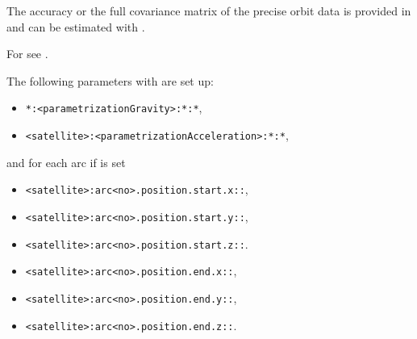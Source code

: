 The accuracy or the full covariance matrix of the precise orbit data is provided in
 and can be estimated with .

For  see .

The following parameters with  are set up:
\begin{itemize}
\item \verb|*:<parametrizationGravity>:*:*|,
\item \verb|<satellite>:<parametrizationAcceleration>:*:*|,
\end{itemize}
and for each arc if  is set
\begin{itemize}
\item \verb|<satellite>:arc<no>.position.start.x::|,
\item \verb|<satellite>:arc<no>.position.start.y::|,
\item \verb|<satellite>:arc<no>.position.start.z::|.
\item \verb|<satellite>:arc<no>.position.end.x::|,
\item \verb|<satellite>:arc<no>.position.end.y::|,
\item \verb|<satellite>:arc<no>.position.end.z::|.
\end{itemize}


